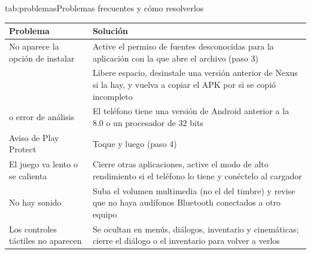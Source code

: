\documentclass[stu,letterpaper,12pt,donotrepeattitle,floatsintext]{apa7}
\begin{document}
\begin{TablaAPA}{tab:problemas}{Problemas frecuentes y cómo resolverlos}
\begin{tabularx}{\linewidth}{P{4.6cm}L}
\toprule
Problema & Solución \\
\midrule
No aparece la opción de instalar & Active el permiso de fuentes desconocidas para la aplicación con la que abre el archivo (paso 3) \\
 & Libere espacio, desinstale una versión anterior de Nexus si la hay, y vuelva a copiar el APK por si se copió incompleto \\
 o error de análisis & El teléfono tiene una versión de Android anterior a la 8.0 o un procesador de 32 bits \\
Aviso de Play Protect & Toque  y luego  (paso 4) \\
El juego va lento o se calienta & Cierre otras aplicaciones, active el modo de alto rendimiento si el teléfono lo tiene y conéctelo al cargador \\
No hay sonido & Suba el volumen multimedia (no el del timbre) y revise que no haya audífonos Bluetooth conectados a otro equipo \\
Los controles táctiles no aparecen & Se ocultan en menús, diálogos, inventario y cinemáticas; cierre el diálogo o el inventario para volver a verlos \\
\bottomrule
\end{tabularx}
\end{TablaAPA}

\printbibliography
\end{document}
